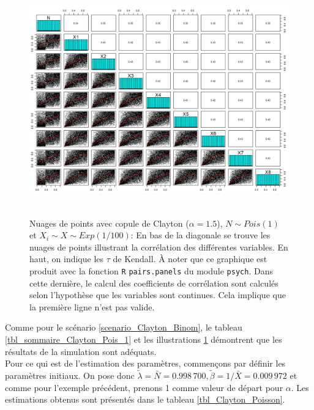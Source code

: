 \documentclass{article}
\begin{document}
		\begin{figure}[H]
			\centering
			\includegraphics[height=10cm]{Graph/scatterplot_Poisson_1.png}
			\caption[Nuages de points du scénario \ref{scenario_Clayton_Pois}]{Nuages de points avec copule de Clayton ($\alpha = 1.5$), $N\sim Pois(1)$ et $X_i \sim X\sim Exp(1/100)$:
			En bas de la diagonale se trouve les nuages de points illustrant la corrélation des différentes variables. En haut, on indique les $\tau$ de Kendall. À noter que ce graphique est produit avec la fonction \texttt{R} \texttt{pairs.panels} du module \texttt{psych}. Dans cette dernière, le calcul des coefficients de corrélation sont calculés selon l'hypothèse que les variables sont  continues. Cela implique que la première ligne n'est pas valide.} 
			\label{graph_scatterplot_Poiss_1}
		\end{figure}
	
		Comme pour le scénario \ref{scenario_Clayton_Binom}, le tableau \ref{tbl_sommaire_Clayton_Pois_1} et les illustrations \ref{graph_scatterplot_Poiss_1} démontrent que les résultats de la simulation sont adéquats.\\
		
		Pour ce qui est de l'estimation des paramètres, commençons par définir les paramètres initiaux. On pose donc $\tilde{\lambda} = \bar{N} = 0.998\,700, \tilde{\beta} = 1/\bar{X}= 0.009\,972$ et comme pour l'exemple précédent, prenons 1 comme valeur de départ pour $\alpha$. Les estimations obtenus sont présentés dans le tableau \ref{tbl_Clayton_Poisson}.
		
\end{document}
